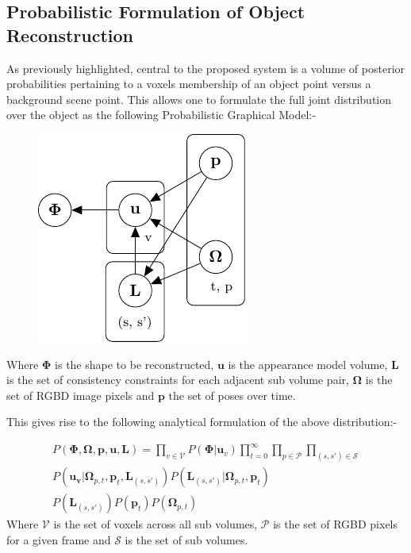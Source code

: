 \subsection{Probabilistic Formulation of Object Reconstruction}
As previously highlighted, central to the proposed system is a volume of posterior probabilities pertaining to a voxels membership of an object 
point versus a background scene point. This allows one to formulate the full joint distribution over the object as the following Probabilistic 
Graphical Model:-
\begin{figure}[h]
	\centering
	\includegraphics{graphical_models/pgm1.pdf}
\end{figure}
Where $\mathbf{\Phi}$ is the shape to be reconstructed, $\mathbf{u}$ is the appearance model volume, $\mathbf{L}$ is the 
set of consistency constraints for each adjacent sub volume pair, $\mathbf{\Omega}$ is the set of RGBD image pixels and $\mathbf{p}$ the 
set of poses over time.

This gives rise to the following analytical formulation of the above distribution:-

\begin{equation}
\begin{split}
P(\mathbf{\Phi}, \mathbf{\Omega}, \mathbf{p}, \mathbf{u}, \mathbf{L}) = 
\prod_{v \in \mathcal{V}}P(\mathbf{\Phi}|\mathbf{u}_{v}) 
\prod_{t=0}^{\infty}\prod_{p \in \mathcal{P}}\prod_{(s, s') \in \mathcal{S}}\\
P(\mathbf{u_{v}}|\mathbf{\Omega}_{p, t}, \mathbf{p}_{t}, \mathbf{L}_{(s, s')})
P(\mathbf{L}_{(s, s')}|\mathbf{\Omega}_{p, t}, \mathbf{p}_{t})\\
P(\mathbf{L}_{(s, s')})P(\mathbf{p}_{t})P(\mathbf{\Omega}_{p, t})
\end{split}
\end{equation}
Where $\mathcal{V}$ is the set of voxels across all sub volumes, $\mathcal{P}$ is the set of RGBD pixels for a given 
frame and $\mathcal{S}$ is the set of sub volumes.


